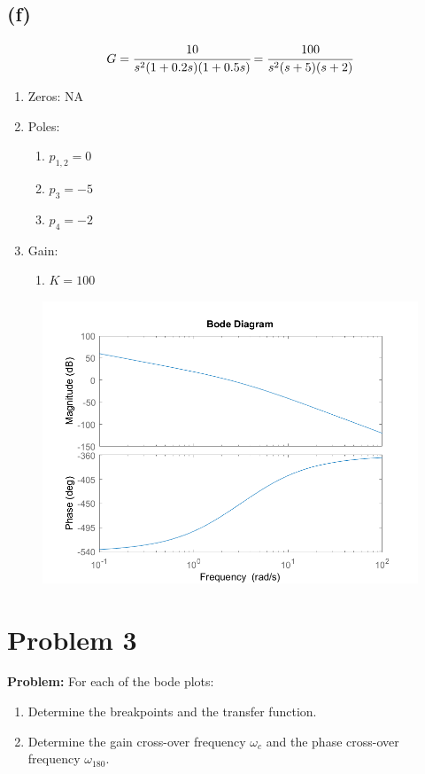 \documentclass[letter]{article}
\numberwithin{equation}{section}
\begin{document}
\subsection{(f)}
\[
	G = \cfrac{
		10
	}{
		s^2 (1 + 0.2s) (1 + 0.5s)
	}
	= \cfrac{
		100
	}{
		s^2 (s+5)(s+2)
	}
\]
\begin{enumerate}
	\item Zeros: NA
	\item Poles:
	\begin{enumerate}
		\item $p_{1,2} = 0$
		\item $p_3 = -5$
		\item $p_4 = -2$
	\end{enumerate}
	\item Gain:
	\begin{enumerate}
		\item $K = 100$
	\end{enumerate}
\end{enumerate}

\begin{figure}[h!]
	\centering
	\includegraphics[width=\textwidth]{figs/pblm2f.png}
\end{figure}

\newpage
\section{Problem 3}
\textbf{Problem:}
For each of the bode plots:
\begin{enumerate}
	\item Determine the breakpoints and the transfer function.
	\item Determine the gain cross-over frequency $\omega_c$ and the phase cross-over frequency $\omega_{180}$.
\end{enumerate}
\end{document}
